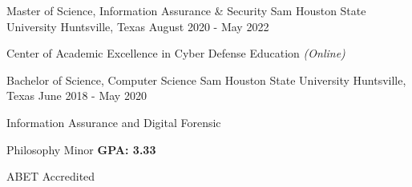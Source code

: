 \begin{cventries}

  \cventry
	{Master of Science, Information Assurance \& Security} %
	{Sam Houston State University} %
	{Huntsville, Texas} %
	{August 2020 - May 2022} %
	{
    \begin{cvitems}
      \item {Center of Academic Excellence in Cyber Defense Education \hfill \textit{(Online)}}
    \end{cvitems}
  }

  \cventry
    {Bachelor of Science, Computer Science} %
    {Sam Houston State University} %
    {Huntsville, Texas} %
    {June 2018 - May 2020} %
    {
      \begin{cvitems} %
        \item{Information Assurance and Digital Forensic}
        \item{Philosophy Minor \hfill \textbf{GPA: 3.33}}
        \item {ABET Accredited}
      \end{cvitems}
    }
\end{cventries}
